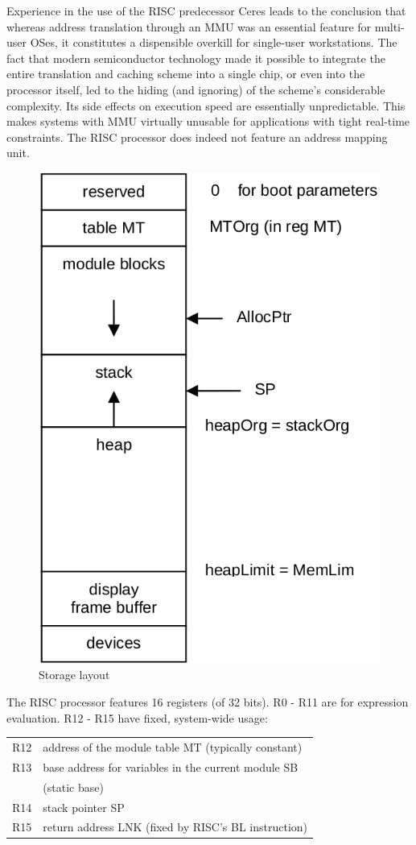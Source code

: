 Experience in the use of the RISC predecessor Ceres leads to the conclusion that whereas
address translation through an MMU was an essential feature for multi-user OSes, it constitutes
a dispensible overkill for single-user workstations. The fact that modern semiconductor technology
made it possible to integrate the entire translation and caching scheme into a single chip,
or even into the processor itself, led to the hiding (and ignoring) of the scheme's considerable
complexity. Its side effects on execution speed are essentially unpredictable. This makes systems
with MMU virtually unusable for applications with tight real-time constraints. The RISC processor
does indeed not feature an address mapping unit.
\begin{figure}[h!]
  \label{fig:storage-layout}
  \centering
  \includegraphics[width=.6\textwidth]{i/q}
  \caption{Storage layout}
\end{figure}

The RISC processor features 16 registers (of 32 bits). R0 - R11 are for expression evaluation.
R12 - R15 have fixed, system-wide usage:
\begin{table}[h!]
  \centering
  \begin{tabular}{l l}
    R12 & address of the module table MT (typically constant) \\
    R13 & base address for variables in the current module SB \\
        & (static base) \\
    R14 & stack pointer SP \\
    R15 & return address LNK (fixed by RISC's BL instruction)
  \end{tabular}
\end{table}

